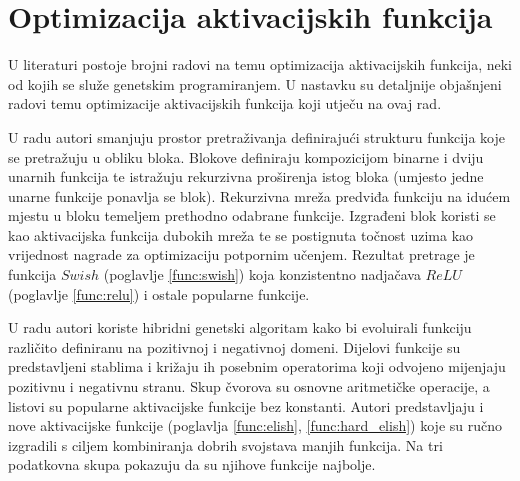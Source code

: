 \documentclass[times, utf8, numeric, diplomski]{fer}
\def\secref#1{(poglavlje \ref{#1})}
\def\TODO#1{\noindent\textcolor{red}{TODO: \textit{#1}}\newline}
\def\todo#1{\TODO{#1}}
\begin{document}
%

\section{Optimizacija aktivacijskih funkcija}
U literaturi postoje brojni radovi na temu optimizacija aktivacijskih funkcija, neki od kojih se služe genetskim programiranjem. U nastavku su detaljnije objašnjeni radovi temu optimizacije aktivacijskih funkcija koji utječu na ovaj rad.

U radu \citet{swish} autori smanjuju prostor pretraživanja definirajući strukturu funkcija koje se pretražuju u obliku bloka. Blokove definiraju kompozicijom binarne i dviju unarnih funkcija te istražuju rekurzivna proširenja istog bloka (umjesto jedne unarne funkcije ponavlja se blok). Rekurzivna mreža predviđa funkciju na idućem mjestu u bloku temeljem prethodno odabrane funkcije. Izgrađeni blok koristi se kao aktivacijska funkcija dubokih mreža te se postignuta točnost uzima kao vrijednost nagrade za optimizaciju potpornim učenjem. Rezultat pretrage je funkcija $Swish$ \secref{func:swish} koja konzistentno nadjačava $ReLU$ \secref{func:relu} i ostale popularne funkcije.

U radu \citet{elish} autori koriste hibridni genetski algoritam kako bi evoluirali funkciju različito definiranu na pozitivnoj i negativnoj domeni. Dijelovi funkcije su predstavljeni stablima i križaju ih posebnim operatorima koji odvojeno mijenjaju pozitivnu i negativnu stranu. Skup čvorova su osnovne aritmetičke operacije, a listovi su popularne aktivacijske funkcije bez konstanti. Autori predstavljaju i nove aktivacijske funkcije (poglavlja \ref{func:elish}, \ref{func:hard_elish}) koje su ručno izgradili s ciljem kombiniranja dobrih svojstava manjih funkcija. Na tri podatkovna skupa pokazuju da su njihove funkcije najbolje.
\end{document}

